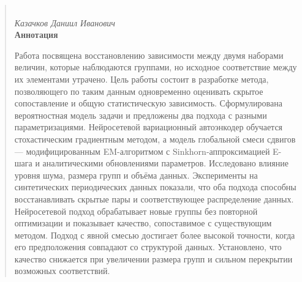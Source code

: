 \begin{abstract}

    \begin{center}
        \large{} \\
        \large\textit{Казачков Даниил Иванович} \\[1 cm]
        \textbf{Аннотация} \\[1 cm]
    \end{center}

    Работа посвящена восстановлению зависимости между двумя наборами величин, которые
    наблюдаются группами, но исходное соответствие между их элементами утрачено. Цель работы
    состоит в разработке метода, позволяющего по таким данным одновременно оценивать скрытое
    сопоставление и общую статистическую зависимость. Сформулирована
    вероятностная модель задачи и предложены два подхода с разными параметризациями.
    Нейросетевой вариационный автоэнкодер обучается стохастическим градиентным методом, а
    модель глобальной смеси сдвигов --- модифицированным EM-алгоритмом с
    Sinkhorn-аппроксимацией E-шага и аналитическими обновлениями параметров. Исследовано
    влияние уровня шума, размера групп и объёма данных. Эксперименты на синтетических
    периодических данных показали, что оба подхода способны восстанавливать скрытые пары и
    соответствующее распределение данных. Нейросетевой подход обрабатывает новые группы без
    повторной оптимизации и показывает качество, сопоставимое с существующим методом.
    Подход с явной смесью достигает более высокой точности, когда его предположения совпадают
    со структурой данных. Установлено, что качество снижается при увеличении размера групп и
    сильном перекрытии возможных соответствий.

\end{abstract}
